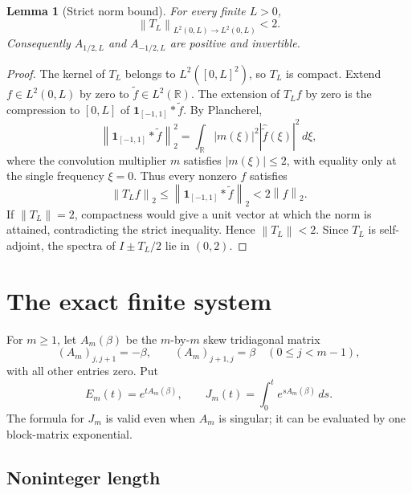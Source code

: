 \documentclass[11pt]{article}
\newtheorem{lemma}[theorem]{Lemma}
\theoremstyle{definition}
\theoremstyle{remark}
\newcommand{\1}{\mathbf 1}
\newcommand{\R}{\mathbb R}
\newcommand{\norm}[1]{\left\lVert #1\right\rVert}
\begin{document}
\begin{lemma}[Strict norm bound]\label{lem:norm}
For every finite $L>0$,
\[
 \norm{T_L}_{L^2(0,L)\to L^2(0,L)}<2.
\]
Consequently $A_{1/2,L}$ and $A_{-1/2,L}$ are positive and invertible.
\end{lemma}

\begin{proof}
The kernel of $T_L$ belongs to $L^2([0,L]^2)$, so $T_L$ is compact.
Extend $f\in L^2(0,L)$ by zero to $\widetilde f\in L^2(\R)$. The extension
of $T_Lf$ by zero is the compression to $[0,L]$ of
$\1_{[-1,1]}*\widetilde f$. By Plancherel,
\[
 \norm{\1_{[-1,1]}*\widetilde f}_2^2
 =\int_{\R}|m(\xi)|^2|\widehat{\widetilde f}(\xi)|^2\,d\xi,
\]
where the convolution multiplier $m$ satisfies $|m(\xi)|\leq2$, with
equality only at the single frequency $\xi=0$. Thus every nonzero $f$
satisfies
\[
 \norm{T_Lf}_2
 \leq\norm{\1_{[-1,1]}*\widetilde f}_2
 <2\norm f_2.
\]
If $\norm{T_L}=2$, compactness would give a unit vector at which the norm is
attained, contradicting the strict inequality. Hence $\norm{T_L}<2$.
Since $T_L$ is self-adjoint, the spectra of $I\pm T_L/2$ lie in
$(0,2)$.
\end{proof}

\section{The exact finite system}

For $m\geq1$, let $A_m(\beta)$ be the $m$-by-$m$ skew tridiagonal matrix
\[
 (A_m)_{j,j+1}=-\beta,\qquad
 (A_m)_{j+1,j}=\beta
 \quad (0\leq j<m-1),
\]
with all other entries zero. Put
\[
 E_m(t)=e^{tA_m(\beta)},\qquad
 J_m(t)=\int_0^t e^{sA_m(\beta)}\,ds.                    \tag{3.1}
\]
The formula for $J_m$ is valid even when $A_m$ is singular; it can be
evaluated by one block-matrix exponential.

\subsection{Noninteger length}
\end{document}
